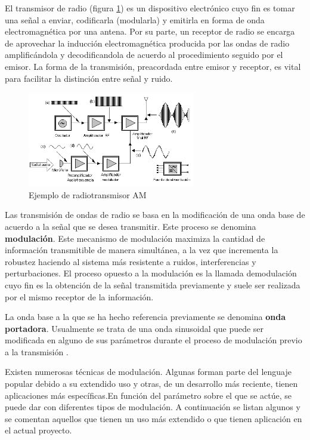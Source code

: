 El transmisor de radio (figura \ref{fig:radiotransmisor}) es un dispositivo electrónico cuyo fin es tomar una señal a enviar, codificarla (modularla) y emitirla en forma de onda electromagnética por una antena. Por su parte, un receptor de radio se encarga de aprovechar la inducción electromagnética producida por las ondas de radio amplificándola y decodificandola de acuerdo al procedimiento seguido por el emisor. La forma de la transmisión, preacordada entre emisor y receptor, es vital para facilitar la distinción entre señal y ruido.

\begin{figure}[b]
\centering
\includegraphics[width=0.65\textwidth]{figuras/Radiotransmisor.png}
\caption{Ejemplo de radiotransmisor AM}
\label{fig:radiotransmisor}
\end{figure}

Las transmisión de ondas de radio se basa en la modificación de una onda base de acuerdo a la señal que se desea transmitir. Este proceso se denomina \textbf{modulación}. Este mecanismo de modulación maximiza la cantidad de información transmitible de manera simultánea, a la vez que incrementa la robustez haciendo al sistema más resistente a ruidos, interferencias y perturbaciones. El proceso opuesto a la modulación es la llamada demodulación cuyo fin es la obtención de la señal transmitida previamente y suele ser realizada por el mismo receptor de la información.

La onda base a la que se ha hecho referencia previamente se denomina \textbf{onda portadora}. Usualmente se trata de una onda sinusoidal que puede ser modificada en alguno de sus parámetros durante el proceso de modulación previo a la transmisión \cite{Cisco:2006}.

Existen numerosas técnicas de modulación. Algunas forman parte del lenguaje popular debido a su extendido uso y otras, de un desarrollo más reciente, tienen aplicaciones más específicas.En función del parámetro sobre el que se actúe, se puede dar con diferentes tipos de modulación. A continuación se listan algunos y se comentan aquellos que tienen un uso más extendido o que tienen aplicación en el actual proyecto.

